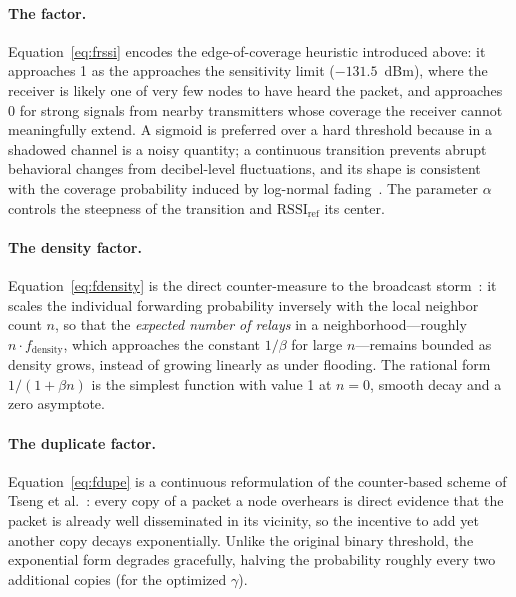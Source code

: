 \documentclass[english,bachelor]{tfgitic}[2026/01/22]
\begin{document}
\paragraph{The  factor.} Equation~\eqref{eq:frssi} encodes the edge-of-coverage heuristic introduced above: it approaches 1 as the  approaches the sensitivity limit ($-131.5$~dBm), where the receiver is likely one of very few nodes to have heard the packet, and approaches 0 for strong signals from nearby transmitters whose coverage the receiver cannot meaningfully extend. A sigmoid is preferred over a hard threshold because  in a shadowed channel is a noisy quantity; a continuous transition prevents abrupt behavioral changes from decibel-level fluctuations, and its shape is consistent with the coverage probability induced by log-normal fading~\cite{senel2011relay,cattani2017reliability}. The parameter $\alpha$ controls the steepness of the transition and $\mathrm{RSSI}_{\text{ref}}$ its center.
 
\paragraph{The density factor.} Equation~\eqref{eq:fdensity} is the direct counter-measure to the broadcast storm~\cite{ni1999broadcast,tseng2002broadcast}: it scales the individual forwarding probability inversely with the local neighbor count $n$, so that the \emph{expected number of relays} in a neighborhood---roughly $n \cdot f_{\text{density}}$, which approaches the constant $1/\beta$ for large $n$---remains bounded as density grows, instead of growing linearly as under flooding. The rational form $1/(1+\beta n)$ is the simplest function with value 1 at $n=0$, smooth decay and a zero asymptote.
 
\paragraph{The duplicate factor.} Equation~\eqref{eq:fdupe} is a continuous reformulation of the counter-based scheme of Tseng et al.~\cite{tseng2002broadcast}: every copy of a packet a node overhears is direct evidence that the packet is already well disseminated in its vicinity, so the incentive to add yet another copy decays exponentially. Unlike the original binary threshold, the exponential form degrades gracefully, halving the probability roughly every two additional copies (for the optimized $\gamma$).
 
\end{document}
